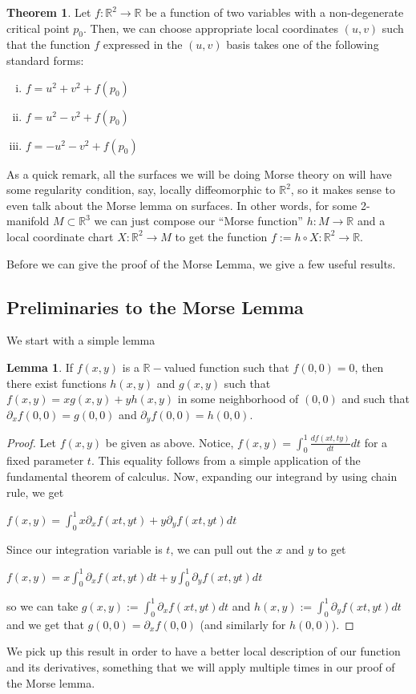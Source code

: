 \documentclass[12pt]{article}
\newcommand{\bR}{{\mathbb R}}
\theoremstyle{definition}
\newtheorem{theorem}{Theorem}
\newtheorem{lemma}{Lemma}
\begin{document}
\begin{theorem}
	Let $f:\bR^2 \rightarrow \bR$ be a function of two variables with a non-degenerate critical point $p_0$. Then, we can choose appropriate local coordinates $(u,v)$ such that the function $f$ expressed in the $(u,v)$ basis takes one of the following standard forms:
	\begin{enumerate}[(i)]
		\item $f = u^2+v^2+f(p_0)$
		\item $f = u^2 - v^2 + f(p_0)$
		\item $f = -u^2 -v^2 + f(p_0)$
	\end{enumerate}
\end{theorem}
\noindent
As a quick remark, all the surfaces we will be doing Morse theory on will have some regularity condition, say, locally diffeomorphic to $\bR^2$, so it makes sense to even talk about the Morse lemma on surfaces. In other words, for some 2-manifold $M\subset \bR^3$ we can just compose our ``Morse function'' $h:M\rightarrow \bR$ and a local coordinate chart $X:\bR^2 \rightarrow M$ to get the function $f:= h\circ X: \bR^2 \rightarrow \bR$. 

Before we can give the proof of the Morse Lemma, we give a few useful results. 
\subsection{Preliminaries to the Morse Lemma}

We start with a simple lemma 
\begin{lemma}\label{lemma:1} 
	If $f(x,y)$ is a $\bR-$valued function such that $f(0,0)= 0$, then there exist functions $h(x,y)$ and $g(x,y)$ such that $f(x,y) = xg(x,y) + yh(x,y)$ in some neighborhood of $(0,0)$ and such that $\partial_xf(0,0) = g(0,0)$ and $\partial_y f(0,0)=h(0,0)$.
\end{lemma}

\begin{proof}
	Let $f(x,y)$ be given as above. Notice, $f(x,y) = \int_0^1 \frac{df(xt,ty)}{dt}dt$ for a fixed parameter $t$. This equality follows from a simple application of the fundamental theorem of calculus. Now, expanding our integrand by using chain rule, we get 
	\begin{center}
		$f(x,y) = \int_0^1 x \partial_x f(xt,yt) + y\partial_y f(xt,yt) dt$
	\end{center}
	Since our integration variable is $t$, we can pull out the $x$ and $y$ to get
	\begin{center}
		$f(x,y) = x\int_0^1 \partial_xf(xt,yt)dt + y \int_0^1 \partial_y f(xt,yt)dt$
	\end{center}
	so we can take $g(x,y):= \int_0^1 \partial_xf(xt,yt)dt$ and $h(x,y):= \int_0^1 \partial_yf(xt,yt)dt$ and we get that $g(0,0) = \partial_xf(0,0)$ (and similarly for $h(0,0)$). 
\end{proof}
We pick up this result in order to have a better local description of our function and its derivatives, something that we will apply multiple times in our proof of the Morse lemma. 
\end{document}

